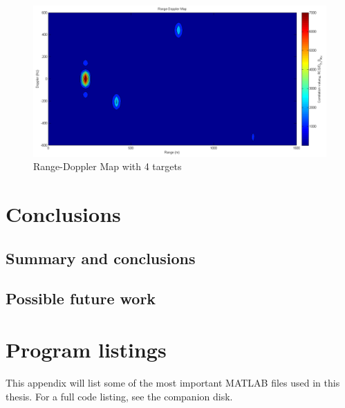 \documentclass[12pt,openany,a4paper]{book}
\begin{document}
\begin{figure}[p]
\centering
\includegraphics{RDMAP2.png}
\caption{Range-Doppler Map with 4 targets}
\label{fig:rdm1}
\end{figure}


\chapter{Conclusions}

\section{Summary and conclusions}

\section{Possible future work}

\appendix


\newpage
{}
\mbox{}
\newpage



\chapter{Program listings}

This appendix will list some of the most important MATLAB files used in this thesis. For a full code listing, see the companion disk.
\end{document}
